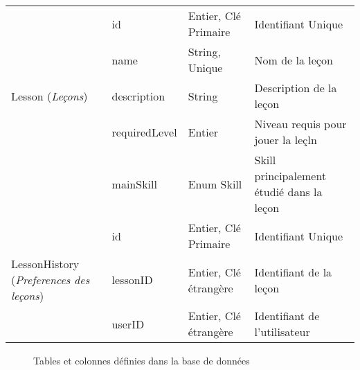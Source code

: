 \begin{longtable}[c]{@{}|p{}|p{}|p{}|p{}|@{}}
														& id                                                   & Entier, Clé Primaire                                                                     & Identifiant Unique                                                                       \\* \cline{2-4} 
														& name                                                 & String, Unique                                                                           & Nom de la leçon                                                                          \\* \cline{2-4} 
	\multirow{-3}{0.18\textwidth}{Lesson (\textit{Leçons})}							& description                                          & String                                                                                   & Description de la leçon                                                                  \\* \cline{2-4} 
														& requiredLevel                                        & Entier                                                                                   & Niveau requis pour jouer la leçln                                                        \\* \cline{2-4} 
							                            & mainSkill                                            & Enum Skill                                                                               & Skill principalement étudié dans la leçon                                                \\* \hline
														& id                                                   & Entier, Clé Primaire                                                                     & Identifiant Unique                                                                       \\* \cline{2-4} 
	\multirow{-2}{0.18\textwidth}{LessonHistory (\textit{Preferences des leçons})}						& lessonID                                             & Entier, Clé étrangère                                                                    & Identifiant de la leçon                                                                  \\* \cline{2-4} 
									                    & userID                                               & Entier, Clé étrangère                                                                    & Identifiant de l'utilisateur                                                             \\* \hline
\end{longtable}
\begin{figure}[H]
	\caption{Tables et colonnes définies dans la base de données}
\end{figure}